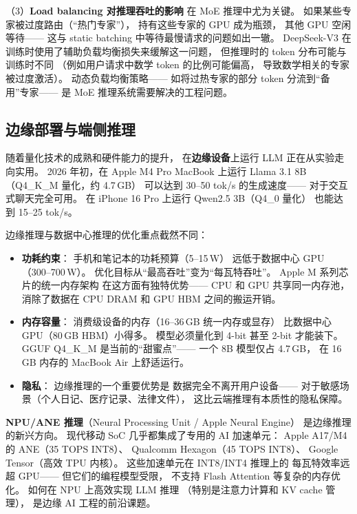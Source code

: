 （3）\textbf{Load balancing 对推理吞吐的影响}
在 MoE 推理中尤为关键。
如果某些专家被过度路由（``热门专家''），
持有这些专家的 GPU 成为瓶颈，
其他 GPU 空闲等待——
这与 static batching 中等待最慢请求的问题如出一辙。
DeepSeek-V3 在训练时使用了辅助负载均衡损失来缓解这一问题，
但推理时的 token 分布可能与训练时不同
（例如用户请求中数学 token 的比例可能偏高，
导致数学相关的专家被过度激活）。
动态负载均衡策略——
如将过热专家的部分 token 分流到``备用''专家——
是 MoE 推理系统需要解决的工程问题。

\subsection{边缘部署与端侧推理}

随着量化技术的成熟和硬件能力的提升，
在\textbf{边缘设备}上运行 LLM 正在从实验走向实用。
2026 年初，在 Apple M4 Pro MacBook 上运行
Llama 3.1 8B（Q4\_K\_M 量化，约 4.7\,GB）
可以达到 30--50 tok/s 的生成速度——
对于交互式聊天完全可用。
在 iPhone 16 Pro 上运行 Qwen2.5 3B（Q4\_0 量化）
也能达到 15--25 tok/s。

边缘推理与数据中心推理的优化重点截然不同：
\begin{itemize}[noitemsep]
  \item \textbf{功耗约束}：
        手机和笔记本的功耗预算（5--15\,W）
        远低于数据中心 GPU（300--700\,W）。
        优化目标从``最高吞吐''变为``每瓦特吞吐''。
        Apple M 系列芯片的统一内存架构
        在这方面有独特优势——
        CPU 和 GPU 共享同一内存池，
        消除了数据在 CPU DRAM 和 GPU HBM 之间的搬运开销。
  \item \textbf{内存容量}：
        消费级设备的内存（16--36\,GB 统一内存或显存）
        比数据中心 GPU（80\,GB HBM）小得多。
        模型必须量化到 4-bit 甚至 2-bit 才能装下。
        GGUF Q4\_K\_M 是当前的``甜蜜点''——
        一个 8B 模型仅占 4.7\,GB，
        在 16\,GB 内存的 MacBook Air 上舒适运行。
  \item \textbf{隐私}：
        边缘推理的一个重要优势是
        数据完全不离开用户设备——
        对于敏感场景（个人日记、医疗记录、法律文件），
        这比云端推理有本质性的隐私保障。
\end{itemize}

\textbf{NPU/ANE 推理}（Neural Processing Unit / Apple Neural Engine）
是边缘推理的新兴方向。
现代移动 SoC 几乎都集成了专用的 AI 加速单元：
Apple A17/M4 的 ANE（35 TOPS INT8）、
Qualcomm Hexagon（45 TOPS INT8）、
Google Tensor（高效 TPU 内核）。
这些加速单元在 INT8/INT4 推理上的
每瓦特效率远超 GPU——
但它们的编程模型受限，
不支持 Flash Attention 等复杂的内存优化。
如何在 NPU 上高效实现 LLM 推理
（特别是注意力计算和 KV cache 管理），
是边缘 AI 工程的前沿课题。

